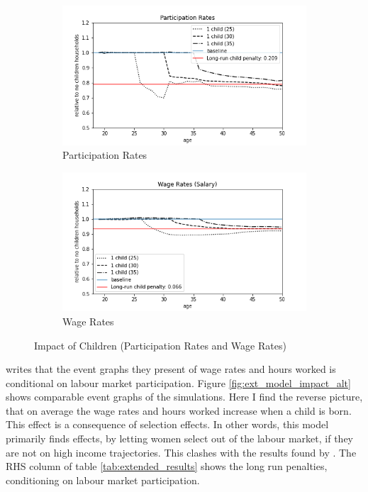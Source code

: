 \begin{figure}[ht]
\begin{subfigure}{.5\textwidth}
  \centering
  \includegraphics[width=1\linewidth]{figures/extended_model_event_participation_rates.png}
  \caption{Participation Rates}
  \label{fig:ext_model_event_partipation}
\end{subfigure}%
\begin{subfigure}{.5\textwidth}
  \centering
  \includegraphics[width=1\linewidth]{figures/extended_model_event_wage_rates.png}
  \caption{Wage Rates}
  \label{fig:ext_model_event_wage_rates}
\end{subfigure}
    \caption{Impact of Children (Participation Rates and Wage Rates)}
    \label{fig:ext_model_impact_participation_wage}
\end{figure}


\textcite{kleven_children_2019} writes that the event graphs they present of wage rates and hours worked is conditional on labour market participation. Figure \ref{fig:ext_model_impact_alt} shows comparable event graphs of the simulations. Here I find the reverse picture, that on average the wage rates and hours worked increase when a child is born. This effect is a consequence of selection effects. In other words, this model primarily finds effects, by letting women select out of the labour market, if they are not on high income trajectories. This clashes with the results found by \textcite{kleven_children_2019}. The RHS column of table \ref{tab:extended_results} shows the long run penalties, conditioning on labour market participation.



